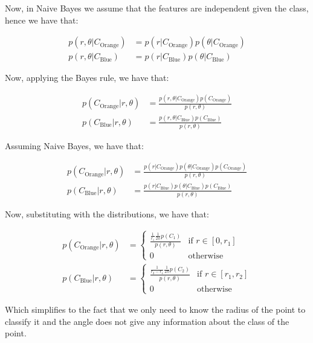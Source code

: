 \documentclass[12pt,a4paper,oneside]{paper}
\begin{document}
Now, in Naive Bayes we assume that the features are independent given the class, hence we have that:

\begin{align*}
    p(r, \theta | C_{\text{Orange}}) &= p(r | C_{\text{Orange}}) p(\theta | C_{\text{Orange}}) \\
    p(r, \theta | C_{\text{Blue}}) &= p(r | C_{\text{Blue}}) p(\theta | C_{\text{Blue}})
\end{align*}

Now, applying the Bayes rule, we have that:

\begin{align*}
    p(C_{\text{Orange}} | r, \theta) &= \frac{p(r, \theta | C_{\text{Orange}}) p(C_{\text{Orange}})}{p(r, \theta)} \\
    p(C_{\text{Blue}} | r, \theta) &= \frac{p(r, \theta | C_{\text{Blue}}) p(C_{\text{Blue}})}{p(r, \theta)}
\end{align*}

Assuming Naive Bayes, we have that: 

\begin{align*}
    p(C_{\text{Orange}} | r, \theta) &= \frac{p(r | C_{\text{Orange}}) p(\theta | C_{\text{Orange}}) p(C_{\text{Orange}})}{p(r, \theta)} \\
    p(C_{\text{Blue}} | r, \theta) &= \frac{p(r | C_{\text{Blue}}) p(\theta | C_{\text{Blue}}) p(C_{\text{Blue}})}{p(r, \theta)}
\end{align*}

Now, substituting with the distributions, we have that:

\begin{align*}
    p(C_{\text{Orange}} | r, \theta) &= \begin{cases}
        \frac{\frac{1}{r_1} \frac{1}{2\pi} p(C_1)}{p(r, \theta)} & \text{if } r \in [0, r_1] \\
        0 & \text{otherwise} 
    \end{cases} \\
    p(C_{\text{Blue}} | r, \theta) &= \begin{cases}
        \frac{\frac{1}{r_2 - r_1} \frac{1}{2\pi} p(C_2)}{p(r, \theta)} & \text{if } r \in [r_1, r_2] \\
        0 & \text{otherwise}
    \end{cases}
\end{align*}

Which simplifies to the fact that we only need to know the radius of the point to classify it
and the angle does not give any information about the class of the point.
\end{document}
